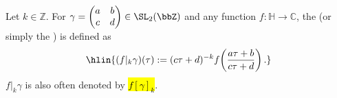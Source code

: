 \begin{definition} \label{definition:weight_k_operator_on_meromorphic_functions_by_elements}
Let $k \in \mathbb{Z}$. For $\gamma = \begin{pmatrix} a & b \\ c & d \end{pmatrix}\in \SL_2(\bbZ)$ and any function $f: \mathbb{H} \to \mathbb{C}$, the  (or simply the ) is defined as
$$\hlin{(f|_k\gamma)(\tau) := (c\tau+d)^{-k} f\!\left(\frac{a\tau+b}{c\tau+d}\right).}$$
$f|_k \gamma$ is also often denoted by \hl{$f[\gamma]_k$}.
\end{definition}